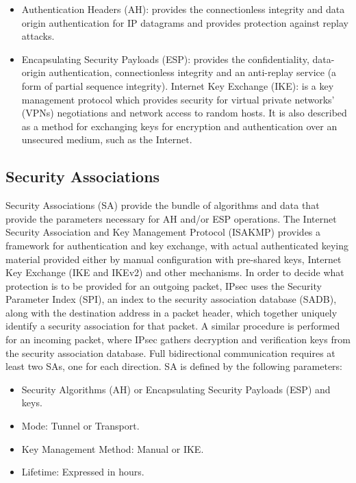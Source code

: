\begin{itemize}
    \item Authentication Headers (AH): provides the connectionless integrity and data origin authentication for IP datagrams and provides protection against replay attacks.
    \item Encapsulating Security Payloads (ESP): provides the confidentiality, data-origin authentication, connectionless integrity and an anti-replay service (a form of partial sequence integrity).  
    Internet Key Exchange (IKE): is a key management protocol which provides security for virtual private networks' (VPNs) negotiations and network access to random hosts. It is also described as a method for exchanging keys for encryption and authentication over an unsecured medium, such as the Internet.
\end{itemize}
      
\subsection{Security Associations}
  
Security Associations (SA) provide the bundle of algorithms and data that provide the parameters necessary for AH and/or ESP operations. The Internet Security Association and Key Management Protocol (ISAKMP) provides a framework for authentication and key exchange, with actual authenticated keying material provided either by manual configuration with pre-shared keys, Internet Key Exchange (IKE and IKEv2) and other mechanisms. In order to decide what protection is to be provided for an outgoing packet, IPsec uses the Security Parameter Index (SPI), an index to the security association database (SADB), along with the destination address in a packet header, which together uniquely identify a security association for that packet. A similar procedure is performed for an incoming packet, where IPsec gathers decryption and verification keys from the security association database.
Full bidirectional communication requires at least two SAs, one for each direction. SA is defined by the following parameters:
  
\begin{itemize}
    \item Security Algorithms (AH) or Encapsulating Security Payloads (ESP) and keys.
    \item Mode: Tunnel or Transport.
    \item Key Management Method: Manual or IKE.
    \item Lifetime: Expressed in hours.
\end{itemize}
      
